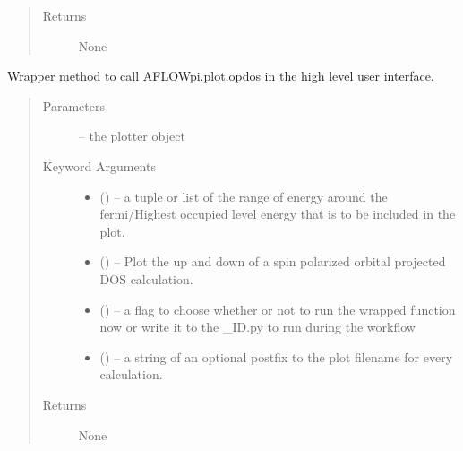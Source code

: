 \documentclass[letterpaper,10pt,english]{sphinxmanual}
\begin{document}
\begin{fulllineitems}
\begin{fulllineitems}
\begin{quote}
\begin{description}
\item[{Returns}] \leavevmode
None

\end{description}\end{quote}

\end{fulllineitems}


\begin{fulllineitems}
\label{\detokenize{prep:prep.plotter.opdos}}
Wrapper method to call AFLOWpi.plot.opdos in the high level user interface.
\begin{quote}\begin{description}
\item[{Parameters}] \leavevmode
{} -- the plotter object

\item[{Keyword Arguments}] \leavevmode\begin{itemize}
\item {} 
 () -- a tuple or list of the range of energy around the fermi/Highest
occupied level energy that is to be included in the plot.

\item {} 
 () -- Plot the up and down of a spin polarized orbital projected DOS
calculation.

\item {} 
 () -- a flag to choose whether or not to run the wrapped function now
or write it to the \_ID.py to run during the workflow

\item {} 
 () -- a string of an optional postfix to the plot filename for every
calculation.

\end{itemize}

\item[{Returns}] \leavevmode
None

\end{description}\end{quote}

\end{fulllineitems}


\begin{fulllineitems}
\label{\detokenize{prep:prep.plotter.phonon}}
\end{fulllineitems}


\end{fulllineitems}
\end{document}
